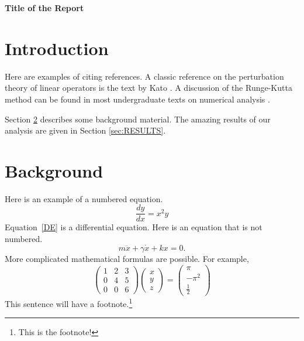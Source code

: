 \documentclass[10pt]{article}
\begin{document}
\centerline{\textbf{\Large Title of the Report}}

\section{Introduction}

Here are examples of citing references. A classic reference on the
perturbation theory of linear operators is the text by Kato \cite{KATO}.
A discussion of the Runge-Kutta method can be found in most undergraduate
texts on numerical analysis \cite{BF,MF}.

Section \ref{sec:BG} describes some background material.
The amazing results of our analysis are given in Section \ref{sec:RESULTS}.

\section{Background}
\label{sec:BG}

Here is an example of a numbered equation.
\begin{equation}
\frac{dy}{dx} = x^2y
\label{DE}
\end{equation}
Equation~\eqref{DE} is a differential equation.
Here is an equation that is not numbered.
\[
   m\ddot{x} + \gamma \dot{x} + k x = 0.
\]
More complicated mathematical formulas are possible.
For example,
\[
\begin{pmatrix}
    1 & 2 & 3 \\
    0 & 4 & 5 \\
    0 & 0 & 6
\end{pmatrix}
\begin{pmatrix}
    x \\
    y \\
    z
\end{pmatrix}
  = \begin{pmatrix}
        \pi \\
        -\pi^2 \\
        \frac{1}{2}
     \end{pmatrix}
\]
This sentence will have a footnote.\footnote{This is the footnote!}
\end{document}
